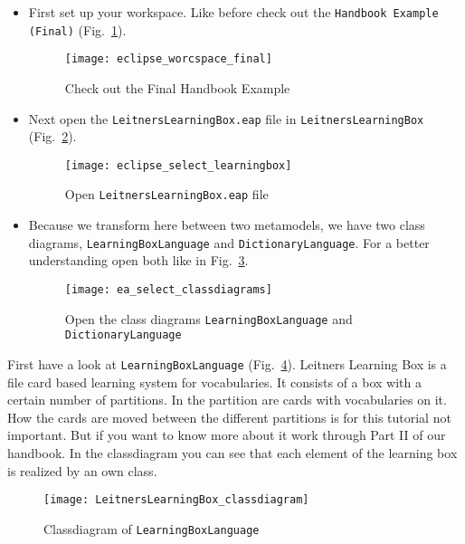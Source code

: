 \begin{itemize}
\item First set up your workspace. Like before check out the \texttt{Handbook Example (Final)} (Fig.~\ref{eclipse_checkout_final}).

\begin{figure}[htbp]
	\centering
  \texttt{[image: eclipse\_worcspace\_final]}
	\caption{Check out the Final Handbook Example} 
	\label{eclipse_checkout_final} 
\end{figure}

\item Next open the \texttt{Leitners\-Learning\-Box.eap} file in \texttt{Leitners\-Learning\-Box} (Fig.~\ref{eclipse_open_eap}).

\begin{figure}[htbp]
	\centering
  \texttt{[image: eclipse\_select\_learningbox]}
	\caption{Open \texttt{Leitners\-Learning\-Box.eap} file} 
	\label{eclipse_open_eap} 
\end{figure}

\item Because we transform here between two metamodels, we have two class diagrams, \texttt{LearningBoxLanguage} and \texttt{DictionaryLanguage}. For a better understanding open both like in Fig.~\ref{ea_select_classdiagrams}.

  \begin{figure}[htbp]
	\centering
  \texttt{[image: ea\_select\_classdiagrams]}
	\caption{Open the class diagrams \texttt{Learning\-Box\-Language} and \texttt{Dictionary\-Language}} 
	\label{ea_select_classdiagrams} 
\end{figure}

\end{itemize}

First have a look at \texttt{Learning\-Box\-Language} (Fig.~\ref{ea:classdiagram_LearningBoxLanguage}). Leitners Learning Box is a file card based learning system for vocabularies. It consists of a box with a certain number of partitions. In the partition are cards with vocabularies on it. How the cards are moved between the different partitions is for this tutorial not important. But if you want to know more about it work through Part II of our handbook.
\newline
In the classdiagram you can see that each element of the learning box is realized by an own class.

\begin{figure}[htbp]
	\centering
  \texttt{[image: LeitnersLearningBox\_classdiagram]}
	\caption{Classdiagram of \texttt{Learning\-Box\-Language}} 
	\label{ea:classdiagram_LearningBoxLanguage} 
\end{figure}

